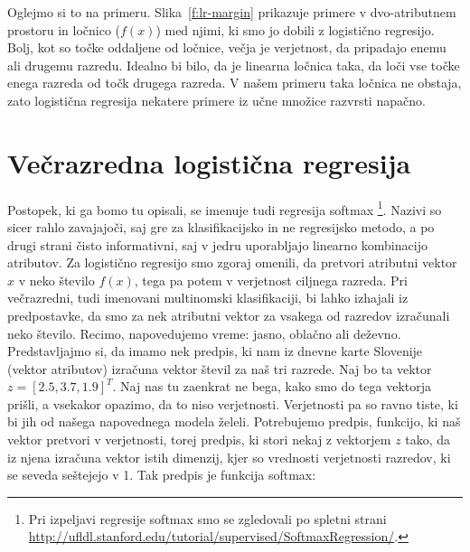 Oglejmo si to na primeru. Slika~\ref{f:lr-margin} prikazuje primere v dvo-atributnem prostoru in ločnico ($f(x)$) med njimi, ki smo jo dobili z logistično regresijo. Bolj, kot so točke oddaljene od ločnice, večja je verjetnost, da pripadajo enemu ali drugemu razredu. Idealno bi bilo, da je linearna ločnica taka, da loči vse točke enega razreda od točk drugega razreda. V našem primeru taka ločnica ne obstaja, zato logistična regresija nekatere primere iz učne množice razvrsti napačno.

\begin{figure}[htbp]
\end{figure}

\section{Večrazredna logistična regresija}

Postopek, ki ga bomo tu opisali, se imenuje tudi regresija softmax \footnote{Pri izpeljavi regresije softmax smo se zgledovali po spletni strani \url{http://ufldl.stanford.edu/tutorial/supervised/SoftmaxRegression/}.}. Nazivi so sicer rahlo zavajajoči, saj gre za klasifikacijsko in ne regresijsko metodo, a po drugi strani čisto informativni, saj v jedru uporabljajo linearno kombinacijo atributov. Za logistično regresijo smo zgoraj omenili, da pretvori atributni vektor $x$ v neko število $f(x)$, tega pa potem v verjetnost ciljnega razreda. Pri večrazredni, tudi imenovani multinomski klasifikaciji, bi lahko izhajali iz predpostavke, da smo za nek atributni vektor za vsakega od razredov izračunali neko število. Recimo, napovedujemo vreme: jasno, oblačno ali deževno. Predstavljajmo si, da imamo nek predpis, ki nam iz dnevne karte Slovenije (vektor atributov) izračuna vektor števil za naš tri razrede. Naj bo ta vektor $z=[2.5, 3.7, 1.9]^T$. Naj nas tu zaenkrat ne bega, kako smo do tega vektorja prišli, a vsekakor opazimo, da to niso verjetnosti. Verjetnosti pa so ravno tiste, ki bi jih od našega napovednega modela želeli. Potrebujemo predpis, funkcijo, ki naš vektor pretvori v verjetnosti, torej predpis, ki stori nekaj z vektorjem $z$ tako, da iz njena izračuna vektor istih dimenzij, kjer so vrednosti verjetnosti razredov, ki se seveda seštejejo v 1. Tak predpis je funkcija softmax:

